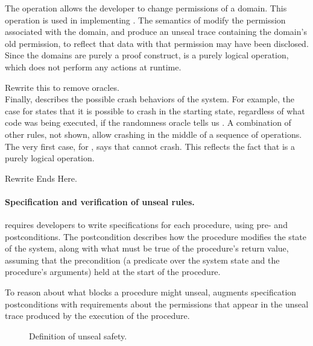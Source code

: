 The  operation allows the developer to
change permissions of a domain.  This operation is used in implementing
.  The semantics of  modify the permission
associated with the domain, and produce an unseal trace containing the domain's
old permission, to reflect that data with that permission may have
been disclosed.  Since the domains are purely a proof construct,
 is a purely logical operation, which does not perform
any actions at runtime.

{\color{red} Rewrite this to remove oracles. }\\
Finally,  describes the possible crash behaviors of the system.
For example, the case for  states that it is possible to
crash in the starting state, regardless of what code was being executed,
if the randomness oracle tells us .  A combination
of other rules, not shown, allow crashing in the middle of a sequence of
operations.  The very first case, for ,
says that  cannot crash.  This reflects the fact that
 is a purely logical operation.

{\color{red} Rewrite Ends Here. }\\

\paragraph{Specification and verification of unseal rules.}

\sys requires developers to write specifications for each procedure, using
pre- and postconditions.  The postcondition describes how the procedure
modifies the state of the system, along with what must be true of the procedure's
return value, assuming that the precondition (a predicate over the system
state and the procedure's arguments) held at the start of the procedure.

To reason about what blocks a procedure might unseal, \sys augments
specification postconditions with requirements about the permissions
that appear in the unseal trace produced by the execution of the procedure.

\begin{figure}[ht]
  
  \caption{Definition of unseal safety.}
  \label{fig:unseal-safety}
\end{figure}

